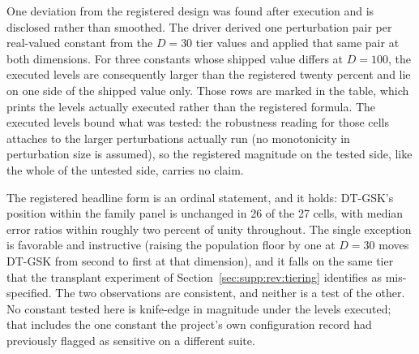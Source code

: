 \documentclass[algorithms,article,submit,moreauthors,pdftex]{Definitions/mdpi}
\newcommand{\dtgsk}{DT-GSK}
\begin{document}
One deviation from the registered design was found after execution and is
disclosed rather than smoothed.  The driver derived one perturbation pair per
real-valued constant from the $D = 30$ tier values and applied that same pair at
both dimensions.  For three constants whose shipped value differs at $D = 100$,
the executed levels are consequently larger than the registered twenty percent
and lie on one side of the shipped value only.  Those rows are marked in the
table, which prints the levels actually executed rather than the registered
formula.  The executed levels bound what was tested: the robustness reading for those
cells attaches to the larger perturbations actually run (no monotonicity in
perturbation size is assumed), so the registered magnitude on the tested
side, like the whole of the untested side, carries no claim.

\begin{table}[H]
\caption{Exploratory one-factor sensitivity of \dtgsk{}'s panel standing.
Descriptive only: no test is performed and no $p$-value is reported.  Rank and
ordinal are recomputed over the seven-algorithm panel with only the \dtgsk{}
column substituted, so the whole panel re-ranks and no rank here may be
differenced against the main-text rank table; W/T/L counts functions where the
shipped configuration beats the perturbed one; Ratio is the median across
functions of perturbed over
shipped mean error.  Perturbed cells use 15 repetitions against the frozen
panel's 51.  Real-valued constants are perturbed by $\pm 20\%$ and integer-valued
constants to the nearest different integer, as registered; the table prints the
levels actually executed.  $^{\ast}$Executed levels at $D = 100$ exceed the registered
twenty percent and are one-sided (registration amendment
A1).}\label{tab:rev-e4}
\resizebox{\textwidth}{!}{}
\end{table}

The registered headline form is an ordinal statement, and it holds: \dtgsk{}'s
position within the family panel is unchanged in 26 of the 27 cells, with median
error ratios within roughly two percent of unity throughout.  The single
exception is favorable and instructive (raising the population floor by one
at $D = 30$ moves \dtgsk{} from second to first at that dimension), and it
falls on the same tier that the transplant experiment of
Section~\ref{sec:supp:rev:tiering} identifies as mis-specified.  The two
observations are consistent, and neither is a test of the other.  No constant
tested here is knife-edge in magnitude under the levels executed; that
includes the one constant the project's own configuration record had
previously flagged as sensitive on a different suite.
\end{document}

